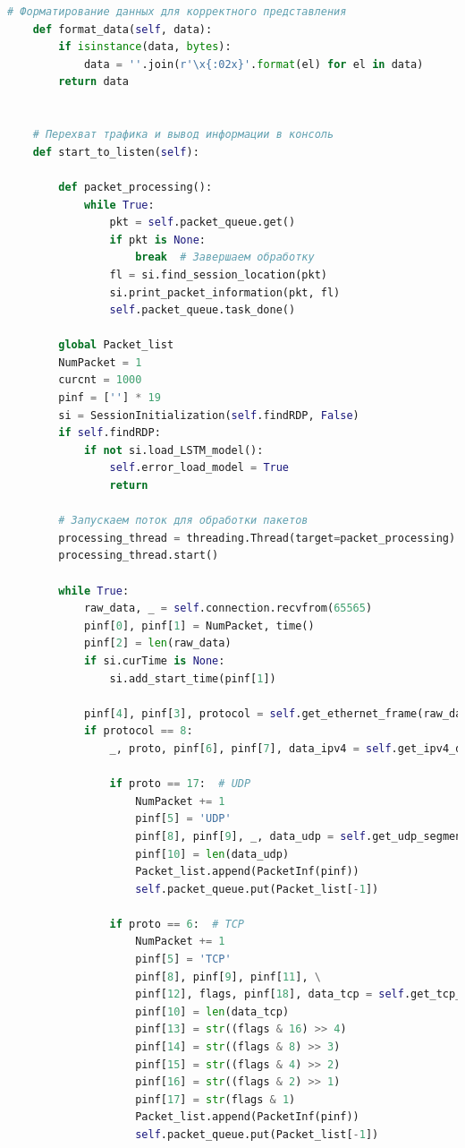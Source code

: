 \documentclass[bachelor, och, coursework]{SCWorks}
\begin{document}
\begin{lstlisting}[language=Python]
    # Форматирование данных для корректного представления
    def format_data(self, data):
        if isinstance(data, bytes):
            data = ''.join(r'\x{:02x}'.format(el) for el in data)
        return data


    # Перехват трафика и вывод информации в консоль
    def start_to_listen(self):
        
        def packet_processing():
            while True:
                pkt = self.packet_queue.get()
                if pkt is None:
                    break  # Завершаем обработку
                fl = si.find_session_location(pkt)
                si.print_packet_information(pkt, fl)
                self.packet_queue.task_done()

        global Packet_list
        NumPacket = 1
        curcnt = 1000
        pinf = [''] * 19
        si = SessionInitialization(self.findRDP, False)
        if self.findRDP:
            if not si.load_LSTM_model():
                self.error_load_model = True
                return

        # Запускаем поток для обработки пакетов
        processing_thread = threading.Thread(target=packet_processing)
        processing_thread.start()

        while True:
            raw_data, _ = self.connection.recvfrom(65565)
            pinf[0], pinf[1] = NumPacket, time()
            pinf[2] = len(raw_data)
            if si.curTime is None:
                si.add_start_time(pinf[1])

            pinf[4], pinf[3], protocol = self.get_ethernet_frame(raw_data)
            if protocol == 8:
                _, proto, pinf[6], pinf[7], data_ipv4 = self.get_ipv4_data(raw_data[14:])

                if proto == 17:  # UDP
                    NumPacket += 1
                    pinf[5] = 'UDP'
                    pinf[8], pinf[9], _, data_udp = self.get_udp_segment(data_ipv4)
                    pinf[10] = len(data_udp)
                    Packet_list.append(PacketInf(pinf))
                    self.packet_queue.put(Packet_list[-1])

                if proto == 6:  # TCP
                    NumPacket += 1
                    pinf[5] = 'TCP'
                    pinf[8], pinf[9], pinf[11], \
                    pinf[12], flags, pinf[18], data_tcp = self.get_tcp_segment(data_ipv4)
                    pinf[10] = len(data_tcp)
                    pinf[13] = str((flags & 16) >> 4)
                    pinf[14] = str((flags & 8) >> 3)
                    pinf[15] = str((flags & 4) >> 2)
                    pinf[16] = str((flags & 2) >> 1)
                    pinf[17] = str(flags & 1)
                    Packet_list.append(PacketInf(pinf))
                    self.packet_queue.put(Packet_list[-1])


\end{lstlisting}
\end{document}
